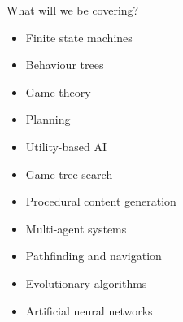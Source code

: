 \begin{frame}{What will we be covering?}
	\begin{itemize}
		\pause\item Finite state machines
		\pause\item Behaviour trees
		\pause\item Game theory
		\pause\item Planning
		\pause\item Utility-based AI
		\pause\item Game tree search
		\pause\item Procedural content generation
		\pause\item Multi-agent systems
		\pause\item Pathfinding and navigation
		\pause\item Evolutionary algorithms
		\pause\item Artificial neural networks
	\end{itemize}
\end{frame}
